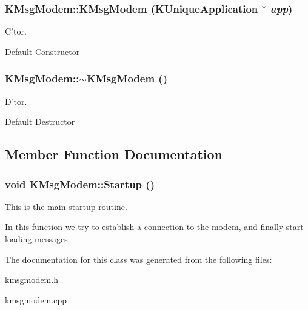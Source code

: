 \subsubsection{\setlength{\rightskip}{0pt plus 5cm}KMsg\-Modem::KMsg\-Modem (KUnique\-Application $\ast$ {\em app})}\label{classKMsgModem_a0}


C'tor. 

Default Constructor 
\subsubsection{\setlength{\rightskip}{0pt plus 5cm}KMsg\-Modem::$\sim${\bf KMsg\-Modem} ()\hspace{0.3cm}{\tt  [virtual]}}\label{classKMsgModem_a1}


D'tor. 

Default Destructor 

\subsection{Member Function Documentation}
\subsubsection{\setlength{\rightskip}{0pt plus 5cm}void KMsg\-Modem::Startup ()}\label{classKMsgModem_a2}


This is the main startup routine. 

In this function we try to establish a connection to the modem, and finally start loading messages. 

The documentation for this class was generated from the following files:\begin{CompactItemize}
\item 
kmsgmodem.h\item 
kmsgmodem.cpp\end{CompactItemize}
